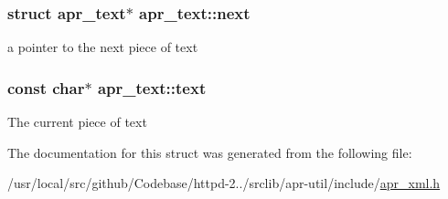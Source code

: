 \subsubsection[{\texorpdfstring{next}{next}}]{\setlength{\rightskip}{0pt plus 5cm}struct {\bf apr\+\_\+text}$\ast$ apr\+\_\+text\+::next}\hypertarget{structapr__text_aaf1b48e3f3085522fe7355e7d8893111}{}\label{structapr__text_aaf1b48e3f3085522fe7355e7d8893111}
a pointer to the next piece of text 
\subsubsection[{\texorpdfstring{text}{text}}]{\setlength{\rightskip}{0pt plus 5cm}const char$\ast$ apr\+\_\+text\+::text}\hypertarget{structapr__text_a37a262695c36f740a7777ea9dd0b699d}{}\label{structapr__text_a37a262695c36f740a7777ea9dd0b699d}
The current piece of text 

The documentation for this struct was generated from the following file\+:\begin{DoxyCompactItemize}
\item 
/usr/local/src/github/\+Codebase/httpd-\/2../srclib/apr-\/util/include/\hyperlink{apr__xml_8h}{apr\+\_\+xml.\+h}\end{DoxyCompactItemize}

